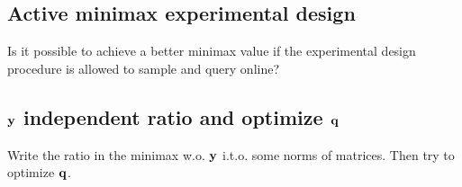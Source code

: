 \documentclass[12pt]{../sty/colt2019/colt2018-arxiv}
\begin{document}
\subsection{Active minimax experimental design}
Is it possible to achieve a better minimax value if the experimental design procedure is allowed to sample and query online?
\subsection{$\mathbf y$ independent ratio and optimize $\mathbf{q}$}
Write the ratio in the minimax w.o. $\mathbf y$ i.t.o. some norms
of matrices. Then try to optimize $\mathbf{q}$.
\end{document}
